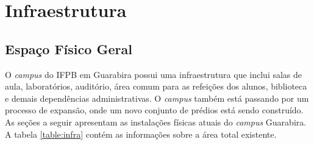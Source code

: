 \newpage
\section{Infraestrutura}

\subsection{Espaço Físico Geral}

O \textit{campus} do IFPB em Guarabira possui uma infraestrutura que inclui salas de aula, laboratórios, auditório, área comum para as refeições dos alunos, biblioteca e demais dependências administrativas. O \textit{campus} também está passando por um processo de expansão, onde um novo conjunto de prédios está sendo construído. As seções a seguir apresentam as instalações físicas atuais do \textit{campus} Guarabira. A tabela \ref{table:infra} contém as informações sobre a área total existente.

